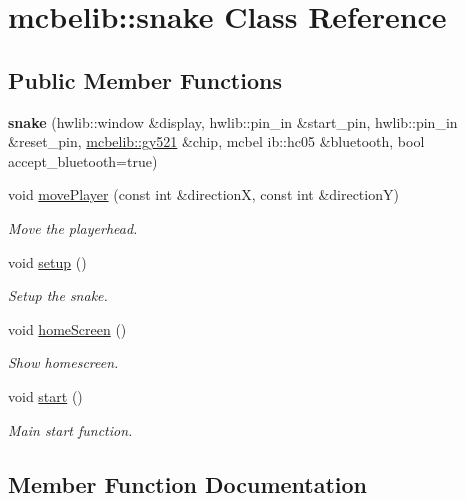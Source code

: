 \hypertarget{classmcbelib_1_1snake}{}\section{mcbelib\+:\+:snake Class Reference}
\label{classmcbelib_1_1snake}
\subsection*{Public Member Functions}
\begin{DoxyCompactItemize}
\item 
\mbox{\label{classmcbelib_1_1snake_a6619e1f14c07f6092f108f8562d8cb17}} 
{\bfseries snake} (hwlib\+::window \&display, hwlib\+::pin\+\_\+in \&start\+\_\+pin, hwlib\+::pin\+\_\+in \&reset\+\_\+pin, \hyperlink{classmcbelib_1_1gy521}{mcbelib\+::gy521} \&chip, mcbel ib\+::hc05 \&bluetooth, bool accept\+\_\+bluetooth=true)
\item 
void \hyperlink{classmcbelib_1_1snake_afdeaee89ca2cfeefc60db77b3101ccf0}{move\+Player} (const int \&directionX, const int \&directionY)
\begin{DoxyCompactList}\small\item\em Move the playerhead. \end{DoxyCompactList}\item 
void \hyperlink{classmcbelib_1_1snake_af3720fcb7cf33fd3e362815824f854ee}{setup} ()
\begin{DoxyCompactList}\small\item\em Setup the snake. \end{DoxyCompactList}\item 
void \hyperlink{classmcbelib_1_1snake_a6e19643fe81ca8098975a22beebf77c1}{home\+Screen} ()
\begin{DoxyCompactList}\small\item\em Show homescreen. \end{DoxyCompactList}\item 
void \hyperlink{classmcbelib_1_1snake_aae04f6565a52ea47decf35f41b7b53b4}{start} ()
\begin{DoxyCompactList}\small\item\em Main start function. \end{DoxyCompactList}\end{DoxyCompactItemize}


\subsection{Member Function Documentation}
\mbox{\label{classmcbelib_1_1snake_a6e19643fe81ca8098975a22beebf77c1}} 
